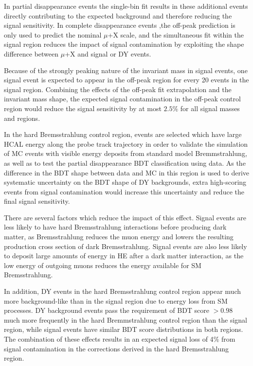 In partial disappearance events the single-bin fit results in these additional events directly contributing to the expected background and therefore reducing the signal sensitivity. 
In complete disappearance events ,the off-peak prediction is only used to predict the nominal $\mu$+X scale, and the simultaneous fit within the signal region reduces the impact of signal contamination by exploiting the shape difference between $\mu$+X and signal or DY events.

Because of the strongly peaking nature of the invariant mass in signal events, one signal event is expected to appear in the off-peak region for every 20 events in the signal region.
Combining the effects of the off-peak fit extrapolation and the invariant mass shape, the expected signal contamination in the off-peak control region would reduce the signal sensitivity by at most $2.5\%$ for all signal masses and regions.

In the hard Bremsstrahlung control region, events are selected which have large HCAL energy along the probe track trajectory in order to validate the simulation of MC events with visible energy deposits from standard model Bremmstrahlung, as well as to test the partial disappearance BDT classification using data. 
As the difference in the BDT shape between data and MC in this region is used to derive systematic uncertainty on the BDT shape of DY backgrounds, extra high-scoring events from signal contamination would increase this uncertainty and reduce the final signal sensitivity.

There are several factors which reduce the impact of this effect.
Signal events are less likely to have hard Bremsstrahlung interactions before producing dark matter, as Bremsstrahlung reduces the muon energy and lowers the resulting production cross section of dark Bremsstrahlung.
Signal events are also less likely to deposit large amounts of energy in HE after a dark matter interaction, as the low energy of outgoing muons reduces the energy available for SM Bremsstrahlung. 

In addition, DY events in the hard Bremsstrahlung control region appear much more background-like than in the signal region due to energy loss from SM processes.
DY background events pass the requirement of BDT score $>0.98$ much more frequently in the hard Bremmstrahlung control region than the signal region, while signal events have similar BDT score distributions in both regions. 
The combination of these effects results in an expected signal loss of 4$\%$ from signal contamination in the corrections derived in the hard Bremsstrahlung region.
